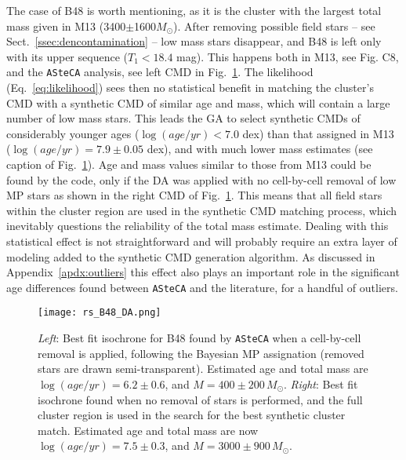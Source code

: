 \documentclass{aa}
\begin{document}
The case of B48 is worth mentioning, as it is the cluster with the largest total
mass given in M13 (3400$\pm$1600$M_{\odot}$).
After removing possible field stars -- see Sect.~\ref{ssec:dencontamination} --
low mass stars disappear, and B48 is left only with its upper sequence 
($T_1<18.4$ mag). This happens both in M13, see Fig. C8, and the
\texttt{ASteCA} analysis, see left CMD in Fig.~\ref{fig:B48_DA}.
%
The likelihood (Eq.~\ref{eq:likelihood}) sees then no statistical benefit in
matching the cluster's CMD with a synthetic CMD of similar age and mass,
which will contain a large number of low mass stars.
This leads the GA to select synthetic CMDs of considerably younger ages
($\log(age/yr){<}7.0$ dex) than that assigned in M13
($\log(age/yr){=}7.9\pm0.05$ dex), and with much lower mass estimates (see
caption of Fig.~\ref{fig:B48_DA}).
%
%
Age and mass values similar to those from M13 could be found by the code, only
if the DA was applied with no cell-by-cell removal of low MP stars as shown in
the right CMD of Fig.~\ref{fig:B48_DA}. This means that all field stars within
the cluster region are used in the synthetic CMD matching process, which
inevitably questions the reliability of the total mass estimate.
%
Dealing with this statistical effect is not straightforward and will probably
require an extra layer of modeling added to the synthetic CMD generation
algorithm.
As discussed in Appendix~\ref{apdx:outliers} this effect also plays an
important role in the significant age differences found between \texttt{ASteCA}
and the literature, for a handful of outliers.

\begin{figure}
\centering
\texttt{[image: rs\_B48\_DA.png]}
\caption{\emph{Left}: Best fit isochrone for B48 found by \texttt{ASteCA} when
a cell-by-cell removal is applied, following the Bayesian MP assignation 
(removed stars are drawn semi-transparent). Estimated age and
total mass are $\log(age/yr){=}6.2{\pm}0.6$, and $M{=}400{\pm}200\,M_{\odot}$.
\emph{Right}: Best fit isochrone found when no removal of stars is performed,
and the full cluster region is used in the search for the best synthetic
cluster match. Estimated age and total mass are now
$\log(age/yr){=}7.5{\pm}0.3$, and $M{=}3000{\pm}900\,M_{\odot}$.}
\label{fig:B48_DA}
\end{figure}
\end{document}

